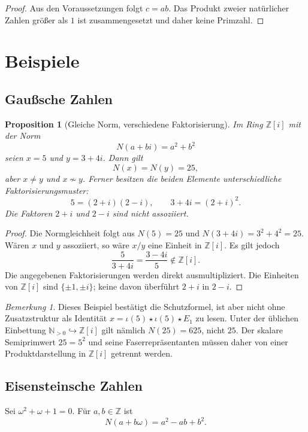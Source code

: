 \documentclass[11pt,a4paper,reqno]{amsart}
\newtheorem{proposition}[theorem]{Proposition}
\theoremstyle{definition}
\theoremstyle{remark}
\newtheorem{remark}[theorem]{Bemerkung}
\newcommand{\Npos}{\mathbb{N}_{>0}}
\newcommand{\Z}{\mathbb{Z}}
\begin{document}
\begin{proof}
Aus den Voraussetzungen folgt $c=ab$. Das Produkt zweier natürlicher Zahlen größer als $1$ ist zusammengesetzt und daher keine Primzahl.
\end{proof}

\section{Beispiele}

\subsection{Gaußsche Zahlen}

\begin{proposition}[Gleiche Norm, verschiedene Faktorisierung]
\label{prop:gauss}
Im Ring $\Z[i]$ mit der Norm
\[
  N(a+bi)=a^2+b^2
\]
seien $x=5$ und $y=3+4i$. Dann gilt
\[
  N(x)=N(y)=25,
\]
aber $x\neq y$ und $x\not\sim y$. Ferner besitzen die beiden Elemente unterschiedliche Faktorisierungsmuster:
\[
  5=(2+i)(2-i),
  \qquad
  3+4i=(2+i)^2.
\]
Die Faktoren $2+i$ und $2-i$ sind nicht assoziiert.
\end{proposition}

\begin{proof}
Die Normgleichheit folgt aus $N(5)=25$ und $N(3+4i)=3^2+4^2=25$. Wären $x$ und $y$ assoziiert, so wäre $x/y$ eine Einheit in $\Z[i]$. Es gilt jedoch
\[
  \frac{5}{3+4i}=\frac{3-4i}{5}\notin\Z[i].
\]
Die angegebenen Faktorisierungen werden direkt ausmultipliziert. Die Einheiten von $\Z[i]$ sind $\{\pm1,\pm i\}$; keine davon überführt $2+i$ in $2-i$.
\end{proof}

\begin{remark}
Dieses Beispiel bestätigt die Schutzformel, ist aber nicht ohne Zusatzstruktur als Identität
$x=\iota(5)\star\iota(5)\star E_1$ zu lesen. Unter der üblichen Einbettung $\Npos\hookrightarrow\Z[i]$ gilt nämlich $N(25)=625$, nicht $25$. Der skalare Semiprimwert $25=5^2$ und seine Faserrepräsentanten müssen daher von einer Produktdarstellung in $\Z[i]$ getrennt werden.
\end{remark}

\subsection{Eisensteinsche Zahlen}

Sei $\omega^2+\omega+1=0$. Für $a,b\in\Z$ ist
\[
  N(a+b\omega)=a^2-ab+b^2.
\]
\end{document}

